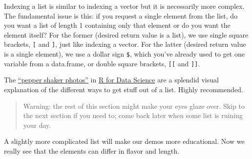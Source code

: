 \documentclass[
]{book}
\newenvironment{Shaded}{\begin{snugshade}}{\end{snugshade}}
\newcommand{\CommentTok}[1]{\textcolor[rgb]{0.56,0.35,0.01}{\textit{#1}}}
\newcommand{\DataTypeTok}[1]{\textcolor[rgb]{0.13,0.29,0.53}{#1}}
\newcommand{\DecValTok}[1]{\textcolor[rgb]{0.00,0.00,0.81}{#1}}
\newcommand{\KeywordTok}[1]{\textcolor[rgb]{0.13,0.29,0.53}{\textbf{#1}}}
\newcommand{\NormalTok}[1]{#1}
\newcommand{\OperatorTok}[1]{\textcolor[rgb]{0.81,0.36,0.00}{\textbf{#1}}}
\newcommand{\OtherTok}[1]{\textcolor[rgb]{0.56,0.35,0.01}{#1}}
\newcommand{\StringTok}[1]{\textcolor[rgb]{0.31,0.60,0.02}{#1}}
\begin{document}
Indexing a list is similar to indexing a vector but it is necessarily more complex. The fundamental issue is this: if you request a single element from the list, do you want a list of length 1 containing only that element or do you want the element itself? For the former (desired return value is a list), we use single square brackets, \texttt{{[}} and \texttt{{]}}, just like indexing a vector. For the latter (desired return value is a single element), we use a dollar sign \texttt{\$}, which you've already used to get one variable from a data.frame, or double square brackets, \texttt{{[}{[}} and \texttt{{]}{]}}.

The \href{https://r4ds.had.co.nz/vectors.html\#lists-of-condiments}{``pepper shaker photos''} in \href{https://r4ds.had.co.nz}{R for Data Science} \citep{wickham2016} are a splendid visual explanation of the different ways to get stuff out of a list. Highly recommended.

\begin{quote}
Warning: the rest of this section might make your eyes glaze over. Skip to the next section if you need to; come back later when some list is ruining your day.
\end{quote}

A slightly more complicated list will make our demos more educational. Now we really see that the elements can differ in flavor and length.

\begin{Shaded}
\end{Shaded}
\end{document}
